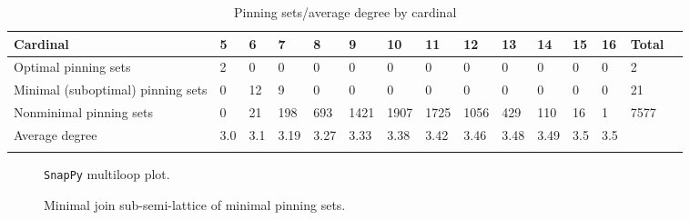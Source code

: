 \documentclass{article}%
\begin{document}
\begin{table}[ht]
	\caption{Pinning sets/average degree by cardinal}
	\centering
	\renewcommand{\arraystretch}{1.5}
	\begin{tabularx}{\textwidth}{lXXXXXXXXXXXXXX}
		\toprule
			Cardinal & 5 & 6 & 7 & 8 & 9 & 10 & 11 & 12 & 13 & 14 & 15 & 16 & Total\\
			\hline
			Optimal pinning sets & 2 & 0 & 0 & 0 & 0 & 0 & 0 & 0 & 0 & 0 & 0 & 0 & 2 \\
			Minimal (suboptimal) pinning sets & 0 & 12 & 9 & 0 & 0 & 0 & 0 & 0 & 0 & 0 & 0 & 0 & 21 \\
			Nonminimal pinning sets & 0 & 21 & 198 & 693 & 1421 & 1907 & 1725 & 1056 & 429 & 110 & 16 & 1 & 7577 \\
			Average degree & 3.0 & 3.1 & 3.19 & 3.27 & 3.33 & 3.38 & 3.42 & 3.46 & 3.48 & 3.49 & 3.5 & 3.5 &  \\
		\bottomrule \\ 
	\end{tabularx}
\end{table}

\begin{multicols}{2}
\begin{figure}[H]
\centering

\caption{\texttt{SnapPy} multiloop plot.}
\label{fig:tex/img/[[4, 28, 1, 5], [5, 21, 6, 20], [3, 19, 4, 20], [27, 14, 28, 15], [1, 22, 2, 21], [6, 2, 7, 3], [23, 18, 24, 19], [15, 11, 16, 10], [26, 9, 27, 10], [13, 8, 14, 9], [22, 8, 23, 7], [17, 12, 18, 13], [.svg}
\end{figure}
\columnbreak

\begin{figure}[H]
\centering
\scalebox{0.8}{}
\caption{Minimal join sub-semi-lattice of minimal pinning sets.}
\label{fig:tex/img/[[4, 28, 1, 5], [5, 21, 6, 20], [3, 19, 4, 20], [27, 14, 28, 15], [1, 22, 2, 21], [6, 2, 7, 3], [23, 18, 24, 19], [15, 11, 16, 10], [26, 9, 27, 10], [13, 8, 14, 9], [22, 8, 23, 7], [17, 12, 18, 13], [.pgf}
\end{figure}
\end{multicols}
\end{document}
